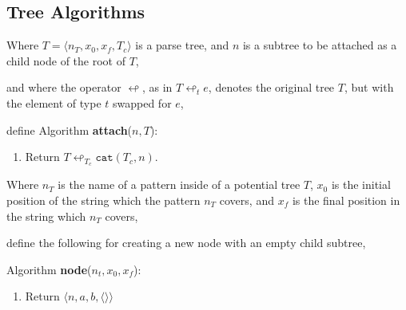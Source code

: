 \subsection{Tree Algorithms}

 \begin{framed}

  Where $T=\langle n_T, x_0, x_f, T_c \rangle$ is a parse tree, and $n$ is a
subtree to be attached as a child node of the root of $T$, 

  \vspace{12pt}
  and where the operator $\looparrowleft$, as in $T \looparrowleft_t e$,
denotes the original tree $T$, but with the element of type $t$ swapped for
$e$,

  \vspace{12pt}
  define Algorithm \textbf{attach}($n, T$):
 
  \begin{enumerate}
   \item Return $T \looparrowleft_{T_c} \texttt{cat}(T_c, n)$.
  \end{enumerate}
 \end{framed}


 \begin{framed}

  Where $n_T$ is the name of a pattern inside of a potential tree $T$, $x_0$ is
the initial position of the string which the pattern $n_T$ covers, and $x_f$ is
the final position in the string which $n_T$ covers,

  \vspace{12pt} 
  define the following for creating a new node with an empty child subtree,

  \vspace{12pt}
  Algorithm \textbf{node}($n_t, x_0, x_f$):
 
  \begin{enumerate}
   \item Return $\langle n, a, b, \langle \rangle \rangle$
  \end{enumerate}
 \end{framed}

